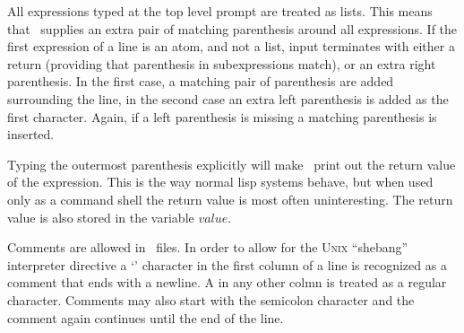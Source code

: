All expressions typed at the top level prompt are treated as lists.
This means that \lips\ supplies an extra pair of matching parenthesis
around all expressions.  If the first expression of a line is an atom,
and not a list, input terminates with either a return (providing that
parenthesis in subexpressions match), or an extra right parenthesis.
In the first case, a matching pair of parenthesis are added
surrounding the line, in the second case an extra left parenthesis is
added as the first character.  Again, if a left parenthesis is missing
a matching parenthesis is inserted.

Typing the outermost parenthesis explicitly will make \lips\ print out
the return value of the expression.  This is the way normal lisp
systems behave, but when used only as a command shell the return value
is most often uninteresting.  The return value is also stored in the
variable $value$.

Comments are allowed in \lips\ files.  In order to allow for the
\textsc{Unix} ``shebang'' interpreter directive a `\lisp{\#}'
character in the first column of a line is recognized as a comment
that ends with a newline. A \lisp{\#} in any other colmn is treated as
a regular character.  Comments may also start with the semicolon
character and the comment again continues until the end of the line.
